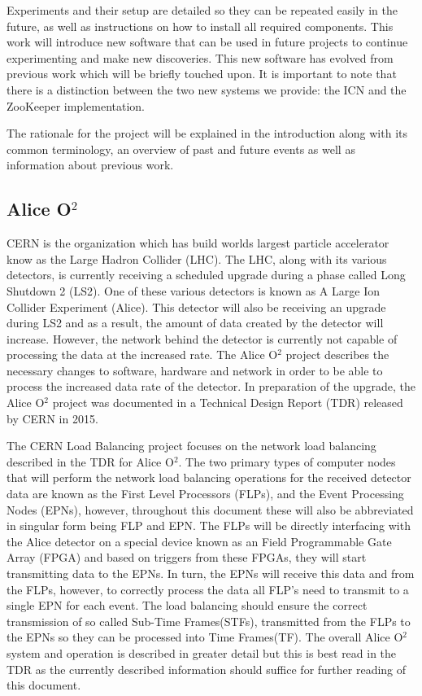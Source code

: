 \documentclass[]{article}
\begin{document}
Experiments and their setup are detailed so they can be repeated easily in the future, as well as instructions on how to install all required components. This work will introduce new software that can be used in future projects to continue experimenting and make new discoveries. This new software has evolved from previous work which will be briefly touched upon. It is important to note that there is a distinction between the two new systems we provide: the ICN and the ZooKeeper implementation.

The rationale for the project will be explained in the introduction along with its common terminology, an overview of past and future events as well as information about previous work.

\subsection*{Alice O$^2$}
CERN is the organization which has build worlds largest particle accelerator know as the Large Hadron Collider (LHC). The LHC, along with its various detectors, is currently receiving a scheduled upgrade during a phase called Long Shutdown 2 (LS2). One of these various detectors is known as A Large Ion Collider Experiment (Alice). This detector will also be receiving an upgrade during LS2 and as a result, the amount of data created by the detector will increase. However, the network behind the detector is currently not capable of processing the data at the increased rate. The Alice O$^2$ project describes the necessary changes to software, hardware and network in order to be able to process the increased data rate of the detector. In preparation of the upgrade, the Alice O$^2$ project was documented in a Technical Design Report (TDR) released by CERN in 2015\cite{Buncic:2011297}.

The CERN Load Balancing project focuses on the network load balancing described in the TDR for Alice O$^2$. The two primary types of computer nodes that will perform the network load balancing operations for the received detector data are known as the First Level Processors (FLPs), and the Event Processing Nodes (EPNs), however, throughout this document these will also be abbreviated in singular form being FLP and EPN. The FLPs will be directly interfacing with the Alice detector on a special device known as an Field Programmable Gate Array (FPGA) and based on triggers from these FPGAs, they will start transmitting data to the EPNs. In turn, the EPNs will receive this data and from the FLPs, however, to correctly process the data all FLP's need to transmit to a single EPN for each event. The load balancing should ensure the correct transmission of so called Sub-Time Frames(STFs), transmitted from the FLPs to the EPNs so they can be processed into Time Frames(TF). The overall Alice O$^2$ system and operation is described in greater detail but this is best read in the TDR\cite{Buncic:2011297} as the currently described information should suffice for further reading of this document.
\end{document}
